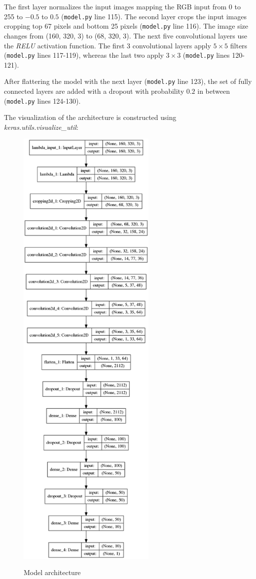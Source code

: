 \documentclass[a4paper,12pt]{article}
\begin{document}
The first layer normalizes the input images mapping the RGB input from 0 to 255 to $-0.5$ to $0.5$ (\texttt{model.py} line 115). The second layer crops the input images cropping top 67 pixels and bottom 25 pixels (\texttt{model.py} line 116). The image size changes from (160, 320, 3) to (68, 320, 3). The next five convolutional layers use the \textit{RELU} activation function. The first 3 convolutional layers apply $5\times 5$ filters (\texttt{model.py} lines 117-119), whereas the last two apply $3 \times 3$ (\texttt{model.py} lines 120-121).

After flattering the model with the next layer (\texttt{model.py} line 123), the set of fully connected layers are added with a dropout with probability $0.2$ in between (\texttt{model.py} lines 124-130).

The visualization of the architecture is constructed using \textit{keras.utils.visualize\_util}:
\begin{figure}[H]
\centering
\includegraphics[height=22.5cm]{figures/model.eps}
\label{fig:effort}
\caption{Model architecture}
\end{figure}
\end{document}
